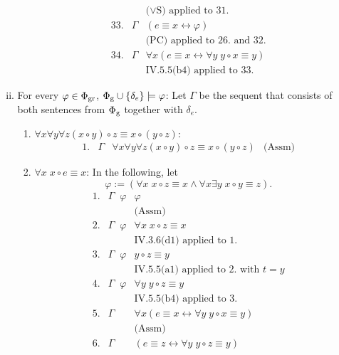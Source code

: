 \begin{enumerate}[1.]
\begin{enumerate}[(i)]
\begin{enumerate}
\[\begin{array}{lll}
\  & \      & \mbox{($\lor$S) applied to 31.} \\
33.& \Gamma & (e \equiv x \leftrightarrow \varphi) \\
\  & \      & \mbox{(PC) applied to 26. and 32.} \\
34.& \Gamma & \forall x (e \equiv x \leftrightarrow \forall y \; y \circ x \equiv y) \\
\  & \      & \mbox{IV.5.5(b4) applied to 33.}
\end{array}
\]
\end{enumerate}
\item For every $\varphi \in \Phi_{\mbox{\scriptsize gr}}$, $\Phi_{\mbox{\scriptsize g}} \cup \{ \delta_e \} \models \varphi$: Let $\Gamma$ be the sequent that consists of both sentences from $\Phi_{\mbox{\scriptsize g}}$ together with $\delta_e$.
\begin{enumerate}
\item $\forall x \forall y \forall z (x \circ y) \circ z \equiv x \circ (y \circ z)$:
\[
\begin{array}{llll}
1. & \Gamma & \forall x \forall y \forall z (x \circ y) \circ z \equiv x \circ (y \circ z) & \mbox{(Assm)}
\end{array}
\]
\item $\forall x \; x \circ e \equiv x$: In the following, let
\[
\varphi := (\forall x \; x \circ z \equiv x \land \forall x \exists y \; x \circ y \equiv z).
\]
\[
\begin{array}{lll}
1. & \Gamma \;\; \varphi & \varphi \\
\  & \                   & \mbox{(Assm)} \\
2. & \Gamma \;\; \varphi & \forall x \; x \circ z \equiv x \\
\  & \                   & \mbox{IV.3.6(d1) applied to 1.} \\
3. & \Gamma \;\; \varphi & y \circ z \equiv y \\
\  & \                   & \mbox{IV.5.5(a1) applied to 2. with $t = y$} \\
4. & \Gamma \;\; \varphi & \forall y \; y \circ z \equiv y \\
\  & \                   & \mbox{IV.5.5(b4) applied to 3.} \\
5. & \Gamma              & \forall x (e \equiv x \leftrightarrow \forall y \; y \circ x \equiv y) \\
\  & \                   & \mbox{(Assm)} \\
6. & \Gamma              & (e \equiv z \leftrightarrow \forall y \; y \circ z \equiv y) \\

\end{array}\]
\end{enumerate}
\end{enumerate}
\end{enumerate}
